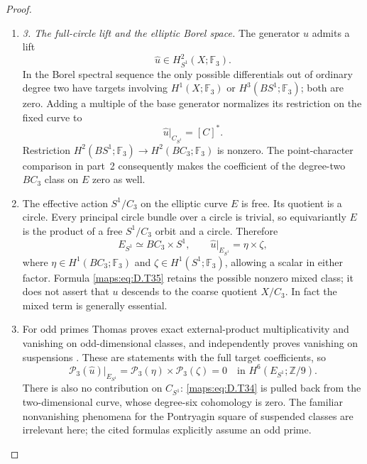 \begin{proof}
\begin{enumerate}[label=\arabic*.,leftmargin=*]
\item \emph{3. The full-circle lift and the elliptic Borel space.}
The generator $u$ admits a lift
\[
                 \widehat u\in H^2_{S^1}(X;\mathbb F_3).
\]
In the Borel spectral sequence the only possible differentials out
of ordinary degree two have targets involving $H^1(X;\mathbb F_3)$
or $H^3(BS^1;\mathbb F_3)$; both are zero. Adding a multiple of the
base generator normalizes its restriction on the fixed curve to
\[
                      \widehat u|_{C_{S^1}}=[C]^* .           \tag{D.T34}\label{maps:eq:D.T34}
\]
Restriction $H^2(BS^1;\mathbb F_3)\to H^2(BC_3;\mathbb F_3)$
is nonzero. The point-character comparison in part~2 consequently
makes the coefficient of the degree-two $BC_3$ class on $E$ zero
as well.

\item The effective action $S^1/C_3$ on the elliptic curve $E$ is free.
Its quotient is a circle. Every principal circle bundle over a
circle is trivial, so equivariantly $E$ is the product of a free
$S^1/C_3$ orbit and a circle. Therefore
\[
 E_{S^1}\simeq BC_3\times S^1,
 \qquad
 \widehat u|_{E_{S^1}}=\eta\times\zeta,                    \tag{D.T35}\label{maps:eq:D.T35}
\]
where $\eta\in H^1(BC_3;\mathbb F_3)$ and
$\zeta\in H^1(S^1;\mathbb F_3)$, allowing a scalar in either
factor. Formula \eqref{maps:eq:D.T35} retains the possible nonzero mixed class;
it does not assert that $u$ descends to the coarse quotient $X/C_3$.
In fact the mixed term is generally essential.

\item For odd primes Thomas proves exact external-product multiplicativity
and vanishing on odd-dimensional classes, and independently proves
vanishing on suspensions
\cite[equations (2.3), (2.5), (2.7), p.267]{ffThomas56}.
These are statements with the full target coefficients, so
\[
 \mathcal P_3(\widehat u)|_{E_{S^1}}
   =\mathcal P_3(\eta)\times\mathcal P_3(\zeta)=0
                       \quad\text{in }H^6(E_{S^1};\mathbb Z/9).
                                                               \tag{D.T36}\label{maps:eq:D.T36}
\]
There is also no contribution on $C_{S^1}$: \eqref{maps:eq:D.T34} is pulled back
from the two-dimensional curve, whose degree-six cohomology is zero.
The familiar nonvanishing phenomena for the Pontryagin square of
suspended classes are irrelevant here; the cited formulas explicitly
assume an odd prime.


\end{enumerate}
\end{proof}
